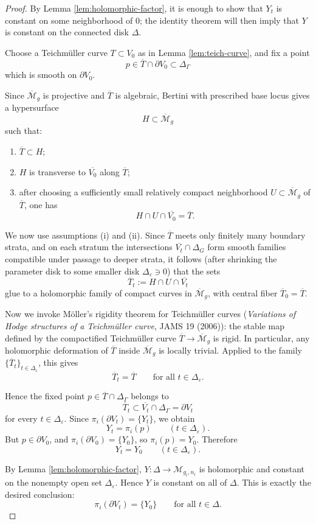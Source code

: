 \documentclass[11pt]{article}
\begin{document}
\begin{proof}
By Lemma \ref{lem:holomorphic-factor}, it is enough to show that $Y_t$ is constant
on some neighborhood of $0$; the identity theorem will then imply that $Y$ is constant
on the connected disk $\Delta$.

Choose a Teichm\"uller curve $T\subset V_0$ as in Lemma \ref{lem:teich-curve}, and fix
a point
\[
p\in \overline{T}\cap \partial V_0\subset \Delta_\Gamma
\]
which is smooth on $\partial V_0$.

Since $\overline{\mathcal M}_g$ is projective and $\overline{T}$ is algebraic, Bertini
with prescribed base locus gives a hypersurface
\[
H\subset \overline{\mathcal M}_g
\]
such that:

\begin{enumerate}[label=\textup{(\alph*)}]
\item $\overline{T}\subset H$;
\item $H$ is transverse to $\overline{V_0}$ along $\overline{T}$;
\item after choosing a sufficiently small relatively compact neighborhood
$U\subset \overline{\mathcal M}_g$ of $\overline{T}$, one has
\[
H\cap U\cap \overline{V_0}=\overline{T}.
\]
\end{enumerate}

We now use assumptions \textup{(i)} and \textup{(ii)}.  Since $\overline{T}$ meets only
finitely many boundary strata, and on each stratum the intersections
$\overline{V_t}\cap \Delta_G$ form smooth families compatible under passage to deeper
strata, it follows (after shrinking the parameter disk to some smaller disk
$\Delta_\varepsilon\ni 0$) that the sets
\[
\overline{T}_t:=H\cap U\cap \overline{V_t}
\]
glue to a holomorphic family of compact curves in $\overline{\mathcal M}_g$, with
central fiber $\overline{T}_0=\overline{T}$.

Now we invoke M\"oller's rigidity theorem for Teichm\"uller curves
(\emph{Variations of Hodge structures of a Teichm\"uller curve}, JAMS 19 (2006)):
the stable map defined by the compactified Teichm\"uller curve $\overline{T}\to
\overline{\mathcal M}_g$ is rigid.  In particular, any holomorphic deformation of
$\overline{T}$ inside $\overline{\mathcal M}_g$ is locally trivial.  Applied to the
family $\{\overline{T}_t\}_{t\in \Delta_\varepsilon}$, this gives
\[
\overline{T}_t=\overline{T}\qquad\text{for all }t\in \Delta_\varepsilon.
\]

Hence the fixed point $p\in \overline{T}\cap \Delta_\Gamma$ belongs to
\[
\overline{T}_t\subset \overline{V_t}\cap \Delta_\Gamma=\partial V_t
\]
for every $t\in \Delta_\varepsilon$.  Since $\pi_i(\partial V_t)=\{Y_t\}$, we obtain
\[
Y_t=\pi_i(p)\qquad (t\in \Delta_\varepsilon).
\]
But $p\in \partial V_0$, and $\pi_i(\partial V_0)=\{Y_0\}$, so $\pi_i(p)=Y_0$.
Therefore
\[
Y_t=Y_0\qquad (t\in \Delta_\varepsilon).
\]

By Lemma \ref{lem:holomorphic-factor}, $Y:\Delta\to \mathcal M_{g_i,n_i}$ is holomorphic
and constant on the nonempty open set $\Delta_\varepsilon$.  Hence $Y$ is constant on
all of $\Delta$.  This is exactly the desired conclusion:
\[
\pi_i(\partial V_t)=\{Y_0\}\qquad\text{for all }t\in \Delta.
\]
\end{proof}
\end{document}
